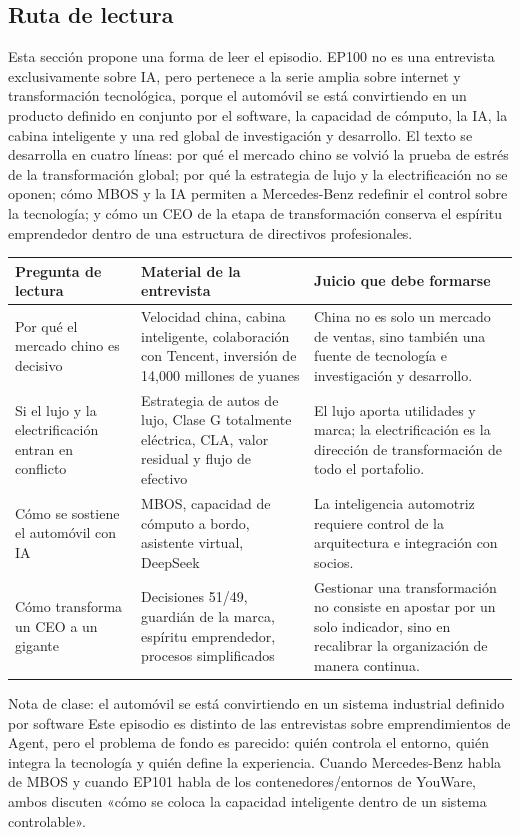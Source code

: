 \documentclass[a4paper]{article}
\begin{document}
\subsection{Ruta de lectura}

Esta sección propone una forma de leer el episodio. EP100 no es una entrevista exclusivamente sobre IA, pero pertenece a la serie amplia sobre internet y transformación tecnológica, porque el automóvil se está convirtiendo en un producto definido en conjunto por el software, la capacidad de cómputo, la IA, la cabina inteligente y una red global de investigación y desarrollo. El texto se desarrolla en cuatro líneas: por qué el mercado chino se volvió la prueba de estrés de la transformación global; por qué la estrategia de lujo y la electrificación no se oponen; cómo MBOS y la IA permiten a Mercedes-Benz redefinir el control sobre la tecnología; y cómo un CEO de la etapa de transformación conserva el espíritu emprendedor dentro de una estructura de directivos profesionales.

\noindent\begin{tabularx}{\textwidth}{p{}p{}X}
\toprule
Pregunta de lectura & Material de la entrevista & Juicio que debe formarse \\
\midrule
Por qué el mercado chino es decisivo & Velocidad china, cabina inteligente, colaboración con Tencent, inversión de 14,000 millones de yuanes & China no es solo un mercado de ventas, sino también una fuente de tecnología e investigación y desarrollo. \\
Si el lujo y la electrificación entran en conflicto & Estrategia de autos de lujo, Clase G totalmente eléctrica, CLA, valor residual y flujo de efectivo & El lujo aporta utilidades y marca; la electrificación es la dirección de transformación de todo el portafolio. \\
Cómo se sostiene el automóvil con IA & MBOS, capacidad de cómputo a bordo, asistente virtual, DeepSeek & La inteligencia automotriz requiere control de la arquitectura e integración con socios. \\
Cómo transforma un CEO a un gigante & Decisiones 51/49, guardián de la marca, espíritu emprendedor, procesos simplificados & Gestionar una transformación no consiste en apostar por un solo indicador, sino en recalibrar la organización de manera continua. \\
\bottomrule
\end{tabularx}

\begin{knowledgebox}{Nota de clase: el automóvil se está convirtiendo en un sistema industrial definido por software}
Este episodio es distinto de las entrevistas sobre emprendimientos de Agent, pero el problema de fondo es parecido: quién controla el entorno, quién integra la tecnología y quién define la experiencia. Cuando Mercedes-Benz habla de MBOS y cuando EP101 habla de los contenedores/entornos de YouWare, ambos discuten «cómo se coloca la capacidad inteligente dentro de un sistema controlable».
\end{knowledgebox}
\end{document}
